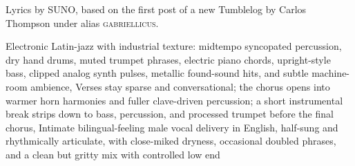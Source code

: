 
\begin{notes}
Lyrics by SUNO, based on the first post of a new Tumblelog by Carlos Thompson under alias \textsc{gabriellicus}.
\end{notes}
\begin{style}
Electronic Latin-jazz with industrial texture: midtempo syncopated percussion, dry hand drums, muted trumpet phrases, electric piano chords, upright-style bass, clipped analog synth pulses, metallic found-sound hits, and subtle machine-room ambience, Verses stay sparse and conversational; the chorus opens into warmer horn harmonies and fuller clave-driven percussion; a short instrumental break strips down to bass, percussion, and processed trumpet before the final chorus, Intimate bilingual-feeling male vocal delivery in English, half-sung and rhythmically articulate, with close-miked dryness, occasional doubled phrases, and a clean but gritty mix with controlled low end
\end{style}
